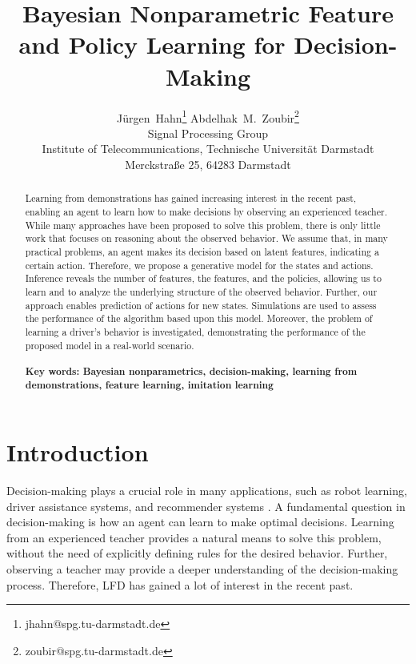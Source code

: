 \documentclass{article}
\begin{document}
\title{Bayesian Nonparametric Feature and Policy Learning for Decision-Making}

\author{J{\"u}rgen~Hahn\footnote{jhahn@spg.tu-darmstadt.de} \quad 
	Abdelhak~M.~Zoubir\footnote{zoubir@spg.tu-darmstadt.de}\\
    Signal Processing Group\\ Institute of Telecommunications, Technische Universit{\"a}t Darmstadt\\ Merckstra{\ss}e 25, 64283 Darmstadt}
\date{}

\maketitle

\begin{abstract}
Learning from demonstrations has gained increasing interest in the recent past, enabling an agent to learn how to make
decisions by observing an experienced teacher. 
While many approaches have been proposed to solve this problem, there is only little work that focuses on reasoning about the observed
behavior.  
We assume that, in many practical problems, an agent makes its decision based on latent features, indicating a certain
action.
Therefore, we propose a generative model for the states and actions. 
Inference reveals the number of features, the features, and the policies, allowing us to learn and to analyze the
underlying structure of the observed behavior.
Further, our approach enables prediction of actions for new states.
Simulations are used to assess the performance of the algorithm based upon this model. 
Moreover, the problem of learning a driver's behavior is investigated, demonstrating the performance of the proposed model in a real-world scenario.\\
 \\
\textbf{Key words: Bayesian nonparametrics, decision-making, learning from demonstrations, feature learning, imitation learning}
\end{abstract}

\section{Introduction}
Decision-making plays a crucial role in many applications, such as robot learning, driver assistance systems, and recommender systems \cite{Shani2002}. 
A fundamental question in decision-making is how an agent can learn to make optimal decisions.
Learning from an experienced teacher provides a natural means to solve this problem, without the need of explicitly defining rules for the desired behavior.
Further, observing a teacher may provide a deeper understanding of the decision-making process. 
Therefore, \ac{LFD} \cite{Argall2009} has gained a lot of interest in the recent past.
\end{document}
